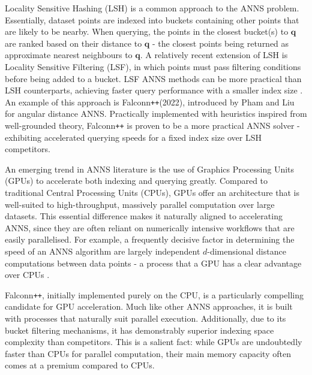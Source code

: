 \documentclass{article}
\newcommand{\bq}{\mathbf{q}}
\newcommand{\fpp}{Falconn\texttt{++}\xspace}
\begin{document}
Locality Sensitive Hashing (LSH) is a common approach to the ANNS problem. Essentially, dataset points are indexed into buckets containing other points that are likely to be nearby. When querying, the points in the closest bucket(s) to $\bq$ are ranked based on their distance to $\bq$ - the closest points being returned as approximate nearest neighbours to $\bq$. A relatively recent extension of LSH is Locality Sensitive Filtering (LSF), in which points must pass filtering conditions before being added to a bucket. LSF ANNS methods can be more practical than LSH counterparts, achieving faster query performance with a smaller index size \cite{christiani2017framework, pham2022falconn++}. An example of this approach is \fpp (2022), introduced by Pham and Liu for angular distance ANNS. Practically implemented with heuristics inspired from well-grounded theory, \fpp is proven to be a more practical ANNS solver - exhibiting accelerated querying speeds for a fixed index size over LSH competitors.

An emerging trend in ANNS literature is the use of Graphics Processing Units (GPUs) to accelerate both indexing and querying greatly. Compared to traditional Central Processing Units (CPUs), GPUs offer an architecture that is well-suited to high-throughput, massively parallel computation over large datasets. This essential difference makes it naturally aligned to accelerating ANNS, since they are often reliant on numerically intensive workflows that are easily parallelised. For example, a frequently decisive factor in determining the speed of an ANNS algorithm are largely independent $d$-dimensional distance computations between data points - a process that a GPU has a clear advantage over CPUs \cite{chang2009compute, chang2008compute, huang2019gpu}. 

\fpp, initially implemented purely on the CPU, is a particularly compelling candidate for GPU acceleration. Much like other ANNS approaches, it is built with processes that naturally suit parallel execution. Additionally, due to its bucket filtering mechanisms, it has demonstrably superior indexing space complexity than competitors. This is a salient fact: while GPUs are undoubtedly faster than CPUs for parallel computation, their main memory capacity often comes at a premium compared to CPUs.
\end{document}
